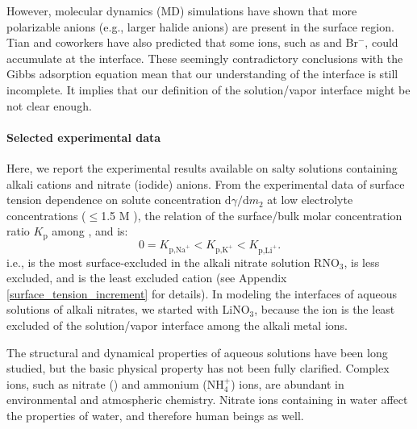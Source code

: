 %
However, molecular dynamics (MD) simulations have shown that more polarizable anions (e.g., larger halide anions) 
are present in the surface region\cite{Jungwirth2001,Jungwirth2002}. 
Tian and coworkers\cite{CST11} have also predicted that some ions, such as \I and Br$^{-}$, could accumulate at the interface.
These seemingly contradictory conclusions with the Gibbs adsorption equation mean that our understanding of the interface is still incomplete. 
It implies that our definition of the solution/vapor interface might be not clear enough. 




\paragraph{Selected experimental data}
Here, we report the experimental results available on salty solutions containing alkali cations and nitrate (iodide) anions\cite{PS03,AJ12,HuaWei2014}. 
From the experimental data of surface tension dependence on solute concentration $\text{d}\gamma/\text{d}m_2$ 
at low electrolyte concentrations ($\leq$1.5 M )\cite{Weissenborn95,Hey81,Jarvis68,Jarvis72}, 
the relation of the surface/bulk molar concentration ratio $K_{\text{p}}$\cite{Pegram2006} among \li, \Na and \K is: 
\begin{equation}
0=K_{\text{p,Na}^+}< K_{\text{p,K}^+}< K_{\text{p,Li}^+}.
\label{eq:bscr}
\end{equation}
i.e., \Na is the most surface-excluded in the alkali nitrate solution RNO$_3$, \K is less excluded, 
and \Li is the least excluded cation (see Appendix \ref{surface_tension_increment} for details).
In modeling the interfaces of aqueous solutions of alkali nitrates, we started with LiNO$_3$, 
because the \Li ion is the least excluded of the solution/vapor interface among the alkali metal ions. 

The structural and dynamical properties of aqueous solutions have been long studied, but the basic physical
property has not been fully clarified.
Complex ions, such as nitrate (\nitrate) and ammonium (NH$_4^+$) ions,
are abundant in environmental and  atmospheric chemistry.\cite{SG05,Yadav2017} 
Nitrate ions containing in water affect the properties of water, and therefore human beings as well.\cite{Comly45,Knobeloch00} 

